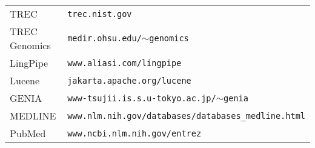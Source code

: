 \documentclass[11pt,oneside]{article}
\begin{document}
\begin{tabular}{ll}

TREC & {\tt trec.nist.gov} \\

TREC Genomics & {\tt medir.ohsu.edu/$\sim$genomics} \\

LingPipe & {\tt www.aliasi.com/lingpipe} \\

Lucene &   {\tt jakarta.apache.org/lucene} \\

GENIA &  {\tt www-tsujii.is.s.u-tokyo.ac.jp/$\sim$genia} \\

MEDLINE &  {\tt www.nlm.nih.gov/databases/databases\_medline.html} \\

PubMed & {\tt www.ncbi.nlm.nih.gov/entrez}

\end{tabular}
\end{document}
